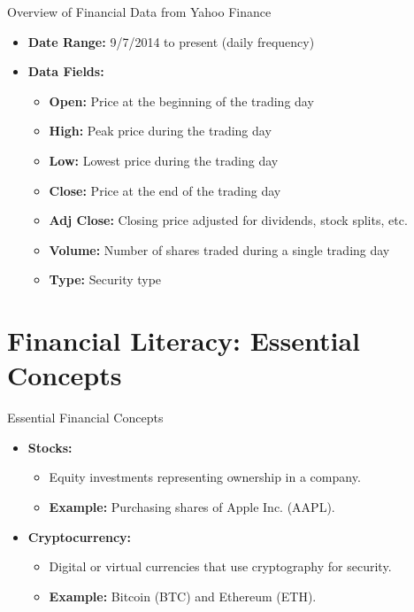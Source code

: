 \documentclass{beamer}
\begin{document}
\begin{frame}{Overview of Financial Data from Yahoo Finance}
    \begin{itemize}
        \item \textbf{Date Range:} 9/7/2014 to present (daily frequency)
        \item \textbf{Data Fields:}
        \begin{itemize}
            \item \textbf{Open:} Price at the beginning of the trading day
            \item \textbf{High:} Peak price during the trading day
            \item \textbf{Low:} Lowest price during the trading day
            \item \textbf{Close:} Price at the end of the trading day
            \item \textbf{Adj Close:} Closing price adjusted for dividends, stock splits, etc.
            \item \textbf{Volume:} Number of shares traded during a single trading day
            \item \textbf{Type:} Security type
        \end{itemize}
    \end{itemize}
\end{frame}

\section{Financial Literacy: Essential Concepts}
\begin{frame}{Essential Financial Concepts}
    \begin{itemize}
        \item \textbf{Stocks:}
        \begin{itemize}
            \item Equity investments representing ownership in a company.
            \item \textbf{Example:} Purchasing shares of Apple Inc. (AAPL).
        \end{itemize}
        \item \textbf{Cryptocurrency:}
        \begin{itemize}
            \item Digital or virtual currencies that use cryptography for security.
            \item \textbf{Example:} Bitcoin (BTC) and Ethereum (ETH).
        \end{itemize}
    \end{itemize}
\end{frame}
\end{document}

